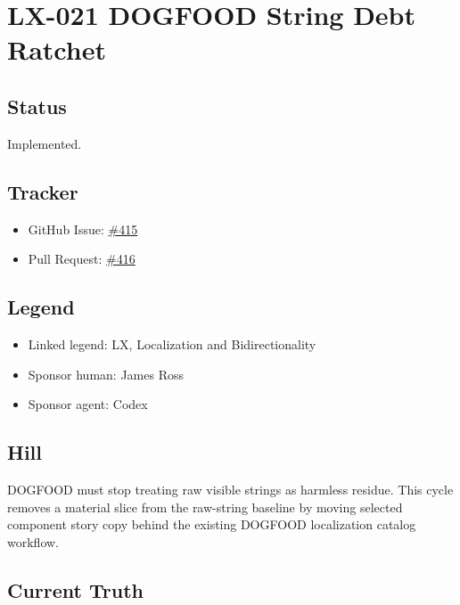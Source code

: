 \chapter{LX-021 DOGFOOD String Debt Ratchet}\label{record-197}

\smallskip

\section{Status}\label{record-197-status}

Implemented.

\section{Tracker}\label{record-197-tracker}

\begin{itemize}
\tightlist
\item
  GitHub Issue: \href{https://github.com/flyingrobots/bijou/issues/415}{\#415}
\item
  Pull Request: \href{https://github.com/flyingrobots/bijou/pull/416}{\#416}
\end{itemize}

\section{Legend}\label{record-197-legend}

\begin{itemize}
\tightlist
\item
  Linked legend: LX, Localization and Bidirectionality
\item
  Sponsor human: James Ross
\item
  Sponsor agent: Codex
\end{itemize}

\section{Hill}\label{record-197-hill}

DOGFOOD must stop treating raw visible strings as harmless residue. This cycle removes a material slice from the raw-string baseline by moving selected component story copy behind the existing DOGFOOD localization catalog workflow.

\section{Current Truth}\label{record-197-current-truth}


